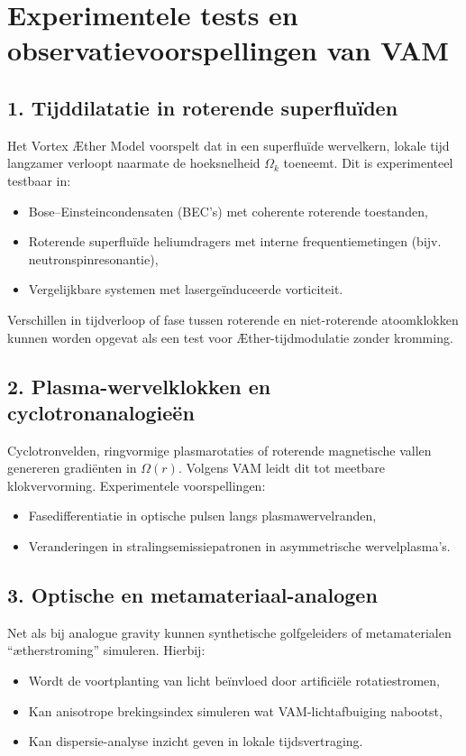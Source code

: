 \section{Experimentele tests en observatievoorspellingen van VAM}


\subsection{1. Tijddilatatie in roterende superfluïden}

Het Vortex Æther Model voorspelt dat in een superfluïde wervelkern, lokale tijd langzamer verloopt naarmate de hoeksnelheid $\Omega_k$ toeneemt. Dit is experimenteel testbaar in:
\begin{itemize}
    \item Bose–Einsteincondensaten (BEC's) met coherente roterende toestanden,
    \item Roterende superfluïde heliumdragers met interne frequentiemetingen (bijv. neutronspinresonantie),
    \item Vergelijkbare systemen met lasergeïnduceerde vorticiteit.
\end{itemize}

Verschillen in tijdverloop of fase tussen roterende en niet-roterende atoomklokken kunnen worden opgevat als een test voor Æther-tijdmodulatie zonder kromming.~\cite{Steinhauer2016}


\subsection{2. Plasma-wervelklokken en cyclotronanalogieën}

Cyclotronvelden, ringvormige plasmarotaties of roterende magnetische vallen genereren gradiënten in $\Omega(r)$. Volgens VAM leidt dit tot meetbare klokvervorming. Experimentele voorspellingen:
\begin{itemize}
    \item Fasedifferentiatie in optische pulsen langs plasmawervelranden,~\cite{Unruh1981}
    \item Veranderingen in stralingsemissiepatronen in asymmetrische wervelplasma's.
\end{itemize}

\subsection{3. Optische en metamateriaal-analogen}

Net als bij analogue gravity kunnen synthetische golfgeleiders of metamaterialen “ætherstroming” simuleren. Hierbij:
\begin{itemize}
    \item Wordt de voortplanting van licht beïnvloed door artificiële rotatiestromen,
    \item Kan anisotrope brekingsindex simuleren wat VAM-lichtafbuiging nabootst,
    \item Kan dispersie-analyse inzicht geven in lokale tijdsvertraging.
\end{itemize}


